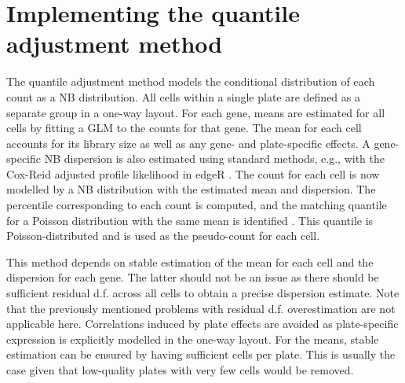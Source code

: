 \documentclass{article}
\begin{document}
\section{Implementing the quantile adjustment method}
The quantile adjustment method models the conditional distribution of each count as a NB distribution.
All cells within a single plate are defined as a separate group in a one-way layout.
For each gene, means are estimated for all cells by fitting a GLM to the counts for that gene.
The mean for each cell accounts for its library size as well as any gene- and plate-specific effects.
A gene-specific NB dispersion is also estimated using standard methods, e.g., with the Cox-Reid adjusted profile likelihood in edgeR \cite{mccarthy2012differential}.
The count for each cell is now modelled by a NB distribution with the estimated mean and dispersion.
The percentile corresponding to each count is computed, and the matching quantile for a Poisson distribution with the same mean is identified \cite{robinson2008small}.
This quantile is Poisson-distributed and is used as the pseudo-count for each cell.

This method depends on stable estimation of the mean for each cell and the dispersion for each gene.
The latter should not be an issue as there should be sufficient residual d.f. across all cells to obtain a precise dispersion estimate.
Note that the previously mentioned problems with residual d.f. overestimation are not applicable here.
Correlations induced by plate effects are avoided as plate-specific expression is explicitly modelled in the one-way layout.
For the means, stable estimation can be ensured by having sufficient cells per plate.
This is usually the case given that low-quality plates with very few cells would be removed.
\end{document}
